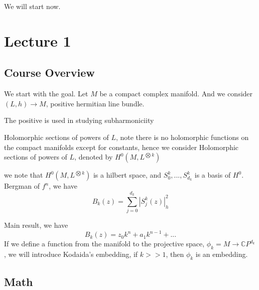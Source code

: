 We will start now.


\chapter{Lecture 1}
\section{Course Overview}
We start with the goal. Let $M$ be a compact complex manifold. And we consider $(L, h)\to M$, positive hermitian line bundle.
\begin{remark}
    The positive is used in studying subharmoniciity
\end{remark}

Holomorphic sections of powers of $L$, note there is no holomorphic functions on the compact manifolds except for constants, hence we consider Holomorphic sections of powers of $L$, denoted by $H^0(M, L^{\bigotimes k})$

we note that $H^0(M, L^{\bigotimes k})$ is a hilbert space, and 
${S_0^k,... , S_{d_k}^k}$ is a basis of $H^0$.
Bergman of $f^n$, we have 
\begin{equation}
    B_k(z)=\sum_{j=0}^{d_k}|S_j^k(z)|_h^2
\end{equation}

Main result, we have
\begin{equation*}
    B_k(z)=z_0k^n+a_1k^{n-1}+...
\end{equation*}
If we define a function from the manifold to the projective space,
$\phi_k=M\to\mathbb{C}P^{d_k}$, we will introduce Kodaida's embedding, if $k>>1$, then $\phi_k$ is an embedding.

\section{Math}
